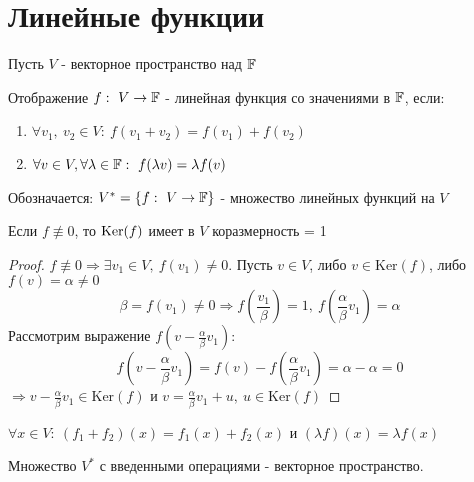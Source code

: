 \section{Линейные функции}
    Пусть $V$ - векторное пространство над $\mathbb{F}$
    \begin{definition}
        Отображение $f: \ V \to \mathbb{F}$ - линейная функция со значениями в $\mathbb{F}$, если:
        \begin{enumerate}
            \item $\forall v_1, \ v_2 \in V: \ f(v_1 + v_2) = f(v_1) + f(v_2)$
            \item $\forall v \in V, \forall \lambda \in \mathbb{F}: \ f(\lambda v) = \lambda f(v)$  
        \end{enumerate}
        Обозначается: $V^{*} = \{f : \ V \to \mathbb{F}\}$ - множество линейных функций на $V$  
    \end{definition}
    \begin{lemma}
        Если $f \not \equiv 0$, то $\textup{Ker}(f)$ имеет в $V$ коразмерность = 1 
    \end{lemma} 
    \begin{proof}
        $f \not \equiv 0 \Rightarrow \exists v_1 \in V, \ f(v_1) \neq 0$. Пусть $v \in V$, либо $v \in \text{Ker}(f)$, либо $f(v) = \alpha \neq 0$ 
        $$\beta = f(v_1) \neq 0 \Longrightarrow f(\frac{v_1}{\beta}) = 1, \ f(\frac{\alpha}{\beta}v_1) = \alpha$$
        Рассмотрим выражение $f(v - \frac{\alpha}{\beta}v_1)$:
        $$f(v - \frac{\alpha}{\beta}v_1) = f(v) - f(\frac{\alpha}{\beta}v_1) = \alpha - \alpha = 0$$
        $\Longrightarrow v - \frac{\alpha}{\beta}v_1 \in \text{Ker}(f)$ и $v = \frac{\alpha}{\beta}v_1 + u, \ u \in \text{Ker}(f)$  
    \end{proof}
    \begin{remark}
        $\forall x \in V: \ (f_1 + f_2)(x) = f_1(x) + f_2(x)$  и $(\lambda f)(x) = \lambda f (x)$ 
    \end{remark}
    \begin{lemma}
        Множество $V^{*}$ с введенными операциями - векторное пространство. 
    \end{lemma}
